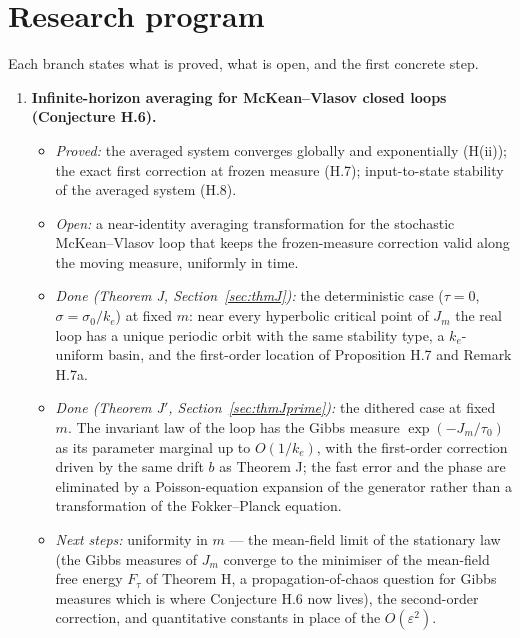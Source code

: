 \section{Research program}\label{sec:program}

Each branch states what is proved, what is open, and the first concrete step.

\begin{enumerate}[label=\arabic*.,leftmargin=*]

\item \textbf{Infinite-horizon averaging for McKean--Vlasov closed loops (Conjecture H.6).}
  \begin{itemize}
    \item \emph{Proved:} the averaged system converges globally and exponentially (H(ii)); the exact first correction
      at frozen measure (H.7); input-to-state stability of the averaged system (H.8).
    \item \emph{Open:} a near-identity averaging transformation for the stochastic McKean--Vlasov loop that keeps the
      frozen-measure correction valid along the moving measure, uniformly in time.
    \item \emph{Done (Theorem J, Section~\ref{sec:thmJ}):} the deterministic case ($\tau=0$, $\sigma=\sigma_0/k_e$)
      at fixed $m$: near every hyperbolic critical point of $J_m$ the real loop has a unique periodic orbit with the
      same stability type, a $k_e$-uniform basin, and the first-order location of Proposition H.7 and Remark H.7a.
    \item \emph{Done (Theorem J$'$, Section~\ref{sec:thmJprime}):} the dithered case at fixed $m$. The invariant law
      of the loop has the Gibbs measure $\exp(-J_m/\tau_0)$ as its parameter marginal up to $O(1/k_e)$, with the
      first-order correction driven by the same drift $b$ as Theorem J; the fast error and the phase are eliminated by
      a Poisson-equation expansion of the generator rather than a transformation of the Fokker--Planck equation.
    \item \emph{Next steps:} uniformity in $m$ --- the mean-field limit of the stationary law (the Gibbs measures of
      $J_m$ converge to the minimiser of the mean-field free energy $F_\tau$ of Theorem H, a propagation-of-chaos
      question for Gibbs measures which is where Conjecture H.6 now lives), the second-order correction, and
      quantitative constants in place of the $O(\varepsilon^2)$.
  \end{itemize}


\end{enumerate}
